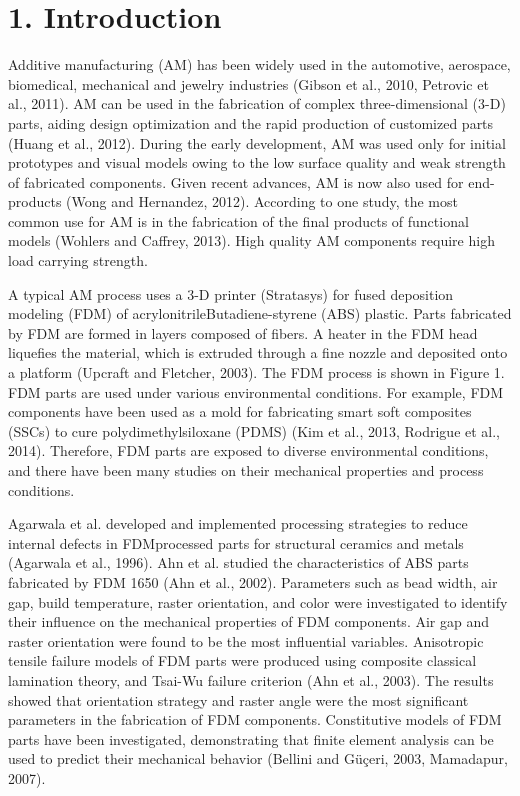 \documentclass[10pt]{article}
\begin{document}
\section*{1. Introduction}
Additive manufacturing (AM) has been widely used in the automotive, aerospace, biomedical, mechanical and jewelry industries (Gibson et al., 2010, Petrovic et al., 2011). AM can be used in the fabrication of complex three-dimensional (3-D) parts, aiding design optimization and the rapid production of customized parts (Huang et al., 2012). During the early development, AM was used only for initial prototypes and visual models owing to the low surface quality and weak strength of fabricated components. Given recent advances, AM is now also used for end-products (Wong and Hernandez, 2012). According to one study, the most common use for AM is in the fabrication of the final products of functional models (Wohlers and Caffrey, 2013). High quality AM components require high load carrying strength.

A typical AM process uses a 3-D printer (Stratasys) for fused deposition modeling (FDM) of acrylonitrileButadiene-styrene (ABS) plastic. Parts fabricated by FDM are formed in layers composed of fibers. A heater in the FDM head liquefies the material, which is extruded through a fine nozzle and deposited onto a platform (Upcraft and Fletcher, 2003). The FDM process is shown in Figure 1. FDM parts are used under various environmental conditions. For example, FDM components have been used as a mold for fabricating smart soft composites (SSCs) to cure polydimethylsiloxane (PDMS) (Kim et al., 2013, Rodrigue et al., 2014). Therefore, FDM parts are exposed to diverse environmental conditions, and there have been many studies on their mechanical properties and process conditions.

Agarwala et al. developed and implemented processing strategies to reduce internal defects in FDMprocessed parts for structural ceramics and metals (Agarwala et al., 1996). Ahn et al. studied the characteristics of ABS parts fabricated by FDM 1650 (Ahn et al., 2002). Parameters such as bead width, air gap, build temperature, raster orientation, and color were investigated to identify their influence on the mechanical properties of FDM components. Air gap and raster orientation were found to be the most influential variables. Anisotropic tensile failure models of FDM parts were produced using composite classical lamination theory, and Tsai-Wu failure criterion (Ahn et al., 2003). The results showed that orientation strategy and raster angle were the most significant parameters in the fabrication of FDM components. Constitutive models of FDM parts have been investigated, demonstrating that finite element analysis can be used to predict their mechanical behavior (Bellini and Güçeri, 2003, Mamadapur, 2007).
\end{document}
